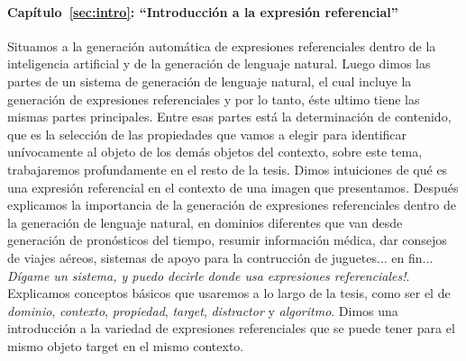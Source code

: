 \paragraph{Cap\'itulo~\ref{sec:intro}: ``Introducci\'on a la expresi\'on referencial''} Situamos a la generaci\'on autom\'atica de expresiones 
referenciales dentro de la inteligencia artificial y de la generaci\'on de lenguaje natural. Luego dimos las partes de un sistema de 
generaci\'on de lenguaje natural, el cual incluye la generaci\'on de expresiones referenciales y por lo tanto, \'este ultimo tiene las mismas 
partes principales. Entre esas partes est\'a la determinaci\'on de contenido, que es la selecci\'on de las propiedades que vamos a elegir 
para identificar un\'ivocamente al objeto de los dem\'as objetos del contexto, sobre este tema, trabajaremos profundamente en el resto de la 
tesis. Dimos intuiciones de qu\'e es una expresi\'on referencial en el contexto de una imagen que presentamos. Despu\'es explicamos la 
importancia de la generaci\'on de expresiones referenciales dentro de la generaci\'on de lenguaje natural, en 
dominios diferentes que van desde generaci\'on de pron\'osticos del tiempo, resumir informaci\'on m\'edica, dar consejos de viajes a\'ereos, 
sistemas de apoyo para la contrucci\'on de juguetes... en fin... {\it D\'igame un sistema, y puedo decirle donde usa expresiones 
referenciales!}. Explicamos conceptos b\'asicos que usaremos a lo largo de la tesis, como ser el de {\it dominio}, {\it contexto}, 
{\it propiedad}, {\it target}, {\it distractor} y {\it algoritmo}. Dimos una introducci\'on a la variedad de expresiones referenciales que 
se puede tener para el mismo objeto target en el mismo contexto.

